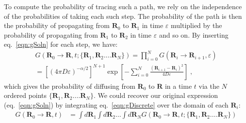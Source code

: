 \documentclass[letterpaper]{tufte-handout}
\renewcommand{\vec}[1]{\mathbf{#1}}
\renewcommand{\refeq}[1]{eq.~\ref{eqn:#1}}
\begin{document}
To compute the probability of tracing such a path, we rely on the independence of the probabilities of taking each such step. The probability of the path is then the probability of propagating from $\vec{R}_0$ to $\vec{R}_1$ in time $\varepsilon$ multiplied by the probability of propagating from $\vec{R}_1$ to $\vec{R}_2$ in time $\varepsilon$ and so on. By inserting \refeq{gSoln} for each step, we have:
\begin{multline} \label{eqn:gDiscrete}
G(\vec{R}_{0} \rightarrow \vec{R} , t ; \{\vec{R}_1, \vec{R}_2. \ldots \vec{R}_N\})  = \prod_{i=0}^{N} G(\vec{R}_{i} \rightarrow \vec{R}_{i+1}, \varepsilon) \\
=  {\left[ {(4\pi D \varepsilon)}^{-\alpha/2} \right]}^{N+1} \exp\left[ - \sum_{i=0}^{N} \frac{{(\vec{R}_{i+1} - \vec{R}_i)}^2}{4D\varepsilon}\right] \; ,
\end{multline}
which gives the probability of diffusing from $\vec{R}_{0}$ to $\vec{R}$ in a time $t$ via the $N$ ordered points $\{\vec{R}_1, \vec{R}_2. \ldots \vec{R}_N\}$. We could recover our original expression (\refeq{gSoln}) by integrating \refeq{gDiscrete} over the domain of each $\vec{R}_{i}$:
\begin{align}
G(\vec{R}_{0} \rightarrow \vec{R} , t) &= \int d\vec{R}_1 \int d\vec{R}_2 \ldots \int d\vec{R}_N  G(\vec{R}_{0} \rightarrow \vec{R} , t ; \{\vec{R}_1, \vec{R}_2. \ldots \vec{R}_N\}) 
\end{align}

\pagebreak
\end{document}
